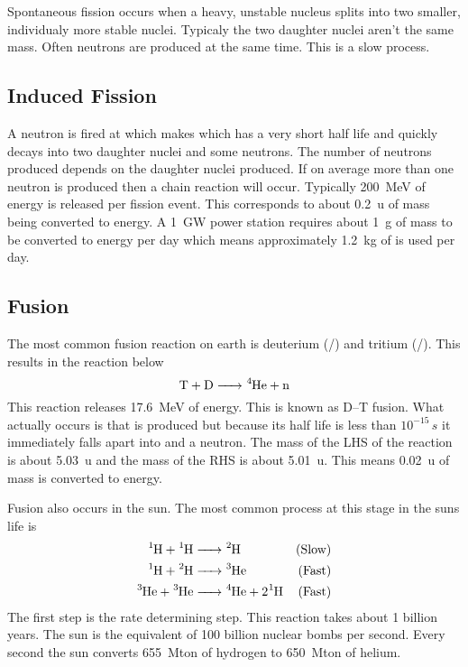 Spontaneous fission occurs when a heavy, unstable nucleus splits into two smaller, individualy more stable nuclei. Typicaly the two daughter nuclei aren't the same mass. Often neutrons are produced at the same time. This is a slow process.

\subsection*{Induced Fission}

A neutron is fired at  which makes  which has a very short half life and quickly decays into two daughter nuclei and some neutrons. The number of neutrons produced depends on the daughter nuclei produced. If on average more than one neutron is produced then a chain reaction will occur. Typically \SI{200}{MeV} of energy is released per fission event. This corresponds to about \SI{0.2}{u} of mass being converted to energy. A \SI{1}{GW} power station requires about \SI{1}{g} of mass to be converted to energy per day which means approximately \SI{1.2}{kg} of  is used per day.

\subsection*{Fusion}

The most common fusion reaction on earth is deuterium (/) and tritium (/). This results in the reaction below
\[\mathrm{T+D}\ce{->^4He}+\neutron\]
This reaction releases \SI{17.6}{MeV} of energy. This is known as D--T fusion.  What actually occurs is that  is produced but because its half life is less than \(10^{-15}\,\si{s}\) it immediately falls apart into  and a neutron. The mass of the LHS of the reaction is about \SI{5.03}{u} and the mass of the RHS is about \SI{5.01}{u}. This means \SI{0.02}{u} of mass is converted to energy.

Fusion also occurs in the sun. The most common process at this stage in the suns life is
\begin{align*}
\ce{^1H}+\ce{^1H}&\ce{->}\ce{^2H} & (\text{Slow})\\
\ce{^1H}+\ce{^2H}&\ce{->}\ce{^3He} & (\text{Fast})\\
\ce{^3He}+\ce{^3He}&\ce{->}\ce{^4He}+2\ce{^1H} & (\text{Fast})
\end{align*}
The first step is the rate determining step. This reaction takes about 1 billion years. The sun is the equivalent of 100 billion nuclear bombs per second. Every second the sun converts \SI{655}{Mton} of hydrogen to \SI{650}{Mton} of helium.

